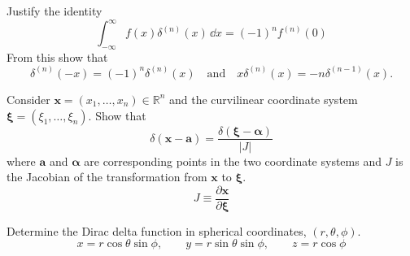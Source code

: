 {\begin{Exercise}
  \label{exercise ode dirac dnx}
  Justify the identity
  \[
  \int_{-\infty}^\infty f(x) \delta^{(n)}(x) \,\dd x = (-1)^n f^{(n)}(0)
  \]
  From this show that
  \[
  \delta^{(n)}(-x) = (-1)^n \delta^{(n)}(x)
  \quad \mathrm{and} \quad
  x \delta^{(n)}(x) = - n \delta^{(n-1)}(x).
  \]

\end{Exercise}









\begin{Exercise}
  \label{exercise ode dirac nd jacobian}
  Consider $\mathbf{x} = (x_1, \ldots, x_n) \in \mathbb{R}^n$ and the curvilinear
  coordinate system $\boldsymbol{\xi} = (\xi_1, \ldots, \xi_n)$.
  Show that
  \[
  \delta(\mathbf{x} - \mathbf{a}) = \frac{ \delta(\boldsymbol{\xi} - \boldsymbol{\alpha}) }{ |J| }
  \]
  where $\mathbf{a}$ and $\boldsymbol{\alpha}$ are corresponding points in the two 
  coordinate systems and $J$ is the Jacobian of the transformation
  from $\mathbf{x}$ to $\boldsymbol{\xi}$.
  \[
  J \equiv \frac{\partial \mathbf{x}}{\partial \boldsymbol{\xi}}
  \]

\end{Exercise}






\begin{Exercise}
  \label{exercise dirac delta spherical}
  Determine the Dirac delta function in spherical coordinates, 
  $(r, \theta, \phi)$.
  \[
  x = r \cos \theta \sin \phi, \qquad
  y = r \sin \theta \sin \phi, \qquad
  z = r \cos \phi
  \]

\end{Exercise}














\raggedbottom
}
